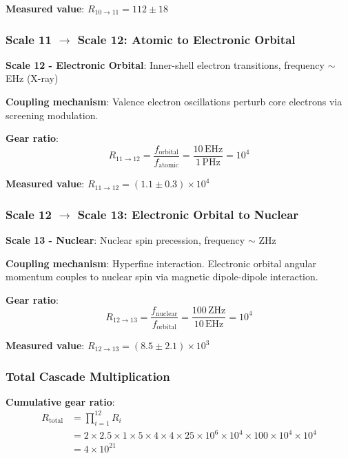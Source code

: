 \documentclass[11pt,onecolumn]{article}
\begin{document}
\textbf{Measured value}: $R_{10 \to 11} = 112 \pm 18$

\subsubsection{Scale 11 $\to$ Scale 12: Atomic to Electronic Orbital}

\textbf{Scale 12 - Electronic Orbital}: Inner-shell electron transitions, frequency $\sim$ EHz (X-ray)

\textbf{Coupling mechanism}: Valence electron oscillations perturb core electrons via screening modulation.

\textbf{Gear ratio}:
\begin{equation}
R_{11 \to 12} = \frac{f_{\text{orbital}}}{f_{\text{atomic}}} = \frac{10\,\text{EHz}}{1\,\text{PHz}} = 10^4
\end{equation}

\textbf{Measured value}: $R_{11 \to 12} = (1.1 \pm 0.3) \times 10^4$

\subsubsection{Scale 12 $\to$ Scale 13: Electronic Orbital to Nuclear}

\textbf{Scale 13 - Nuclear}: Nuclear spin precession, frequency $\sim$ ZHz

\textbf{Coupling mechanism}: Hyperfine interaction. Electronic orbital angular momentum couples to nuclear spin via magnetic dipole-dipole interaction.

\textbf{Gear ratio}:
\begin{equation}
R_{12 \to 13} = \frac{f_{\text{nuclear}}}{f_{\text{orbital}}} = \frac{100\,\text{ZHz}}{10\,\text{EHz}} = 10^4
\end{equation}

\textbf{Measured value}: $R_{12 \to 13} = (8.5 \pm 2.1) \times 10^3$

\subsubsection{Total Cascade Multiplication}

\textbf{Cumulative gear ratio}:
\begin{align}
R_{\text{total}} &= \prod_{i=1}^{12} R_i \\
&= 2 \times 2.5 \times 1 \times 5 \times 4 \times 4 \times 25 \times 10^6 \times 10^4 \times 100 \times 10^4 \times 10^4 \\
&= 4 \times 10^{21}
\end{align}
\end{document}

